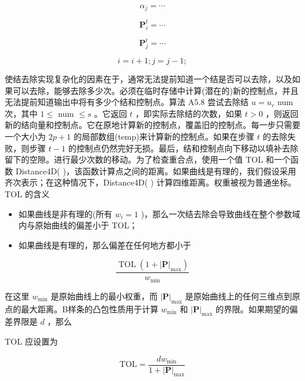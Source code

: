 \documentclass[../main.tex]{subfiles}
\begin{document}
\[
{\alpha }_{j} = \cdots
\]

\[
{\mathbf{P}}_{i}^{t} = \cdots
\]

\[
{\mathbf{P}}_{j}^{t} = \cdots
\]

\[
i = i + 1;j = j - 1;
\]

使结去除实现复杂化的因素在于，通常无法提前知道一个结是否可以去除，以及如果可以去除，能够去除多少次。必须在临时存储中计算(潜在的)新的控制点，并且无法提前知道输出中将有多少个结和控制点。算法 A5.8 尝试去除结 \(u = {u}_{r}\) num 次，其中 \(1 \leq\) num \(\leq  s\) 。它返回 \(t\) ，即实际去除结的次数，如果 \(t > 0\) ，则返回新的结向量和控制点。它在原地计算新的控制点，覆盖旧的控制点。每一步只需要一个大小为 \({2p} + 1\) 的局部数组(temp)来计算新的控制点。如果在步骤 \(t\) 的去除失败，则步骤 \(t - 1\) 的控制点仍然完好无损。最后，结和控制点向下移动以填补去除留下的空隙。进行最少次数的移动。为了检查重合点，使用一个值 TOL 和一个函数 Distance4D(   )，该函数计算点之间的距离。如果曲线是有理的，我们假设采用齐次表示；在这种情况下，Distance4D(   ) 计算四维距离。权重被视为普通坐标。TOL 的含义 \cite{Till92}

\begin{itemize}
\item 如果曲线是非有理的(所有 \({w}_{i} = 1\) )，那么一次结去除会导致曲线在整个参数域内与原始曲线的偏差小于 TOL；
\end{itemize}

\begin{itemize}
\item 如果曲线是有理的，那么偏差在任何地方都小于
\end{itemize}

\[
\frac{\operatorname{TOL}\left( {1 + {\left| \mathbf{P}\right| }_{\max }}\right) }{{w}_{\min }}
\]

在这里 \({w}_{\min }\) 是原始曲线上的最小权重，而 \({\left| \mathbf{P}\right| }_{\max }\) 是原始曲线上的任何三维点到原点的最大距离。B样条的凸包性质用于计算 \({w}_{\min }\) 和 \({\left| \mathbf{P}\right| }_{\max }\) 的界限。如果期望的偏差界限是 \(d\) ，那么

TOL 应设置为

\[
\mathrm{{TOL}} = \frac{d{w}_{\min }}{1 + {\left| \mathbf{P}\right| }_{\max }} \tag{5.30}
\]
\end{document}
